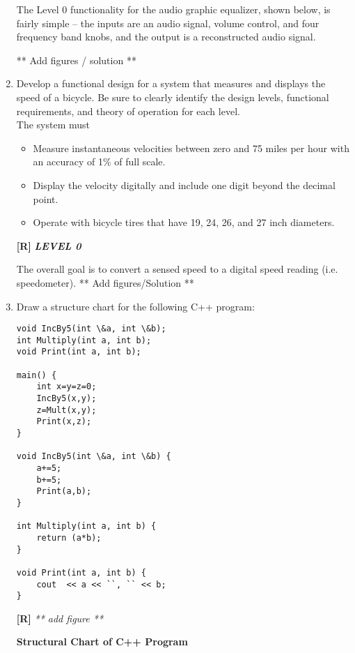 \begin{enumerate}
\begin{onlysolution}
    The Level 0 functionality for the audio graphic equalizer, shown below, 
    is fairly simple – the inputs are an audio signal, volume control, and 
    four frequency band knobs, and the output is a reconstructed audio signal.

    ** Add figures / solution ** 
  \end{onlysolution}
  
\item
  Develop a functional design for a system that measures and displays
  the speed of a bicycle. Be sure to clearly identify the design
  levels, functional requirements, and theory of operation for each
  level.\\
  The system must

\begin{itemize}
\item
  Measure instantaneous velocities between zero and 75 miles per hour
  with an accuracy of 1\% of full scale.
\item
  Display the velocity digitally and include one digit beyond the
  decimal point.
\item
  Operate with bicycle tires that have 19, 24, 26, and 27 inch
  diameters.
\end{itemize}

\begin{onlysolution}
  \textbf{[R]}
  \itshape
  \textbf{LEVEL 0}

  The overall goal is to convert a sensed speed to a digital speed reading 
  (i.e. speedometer).
  ** Add figures/Solution **
\end{onlysolution}

  \item
    Draw a structure chart for the following C++ program:
\begin{verbatim}
void IncBy5(int \&a, int \&b);
int Multiply(int a, int b);
void Print(int a, int b);

main() {
    int x=y=z=0;
    IncBy5(x,y);
    z=Mult(x,y);
    Print(x,z);
}

void IncBy5(int \&a, int \&b) {
    a+=5;
    b+=5;
    Print(a,b);
}

int Multiply(int a, int b) {
    return (a*b);
}

void Print(int a, int b) {
    cout  << a << ``, `` << b;
}
\end{verbatim}

\begin{onlysolution}
  \textbf{[R]}
  \itshape
  ** add figure **
  \begin{center}
    \textbf{Structural Chart of C++ Program}
  \end{center}
\end{onlysolution}


\end{enumerate}
